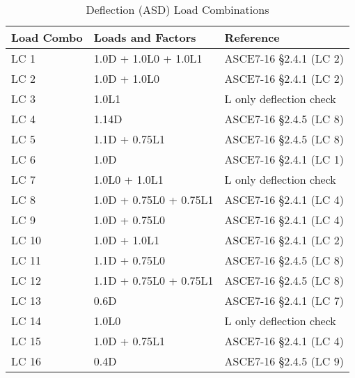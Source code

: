 \documentclass[12pt, fleqn]{article}
\begin{document}
\begin{table}[H]
\caption{Deflection (ASD) Load Combinations}
\centering
\begin{tabular}{l l l}
\hline
Load Combo & Loads and Factors & Reference\\
\hline
LC 1 & 1.0D + 1.0L0 + 1.0L1 & ASCE7-16 \S2.4.1 (LC 2)\\
LC 2 & 1.0D + 1.0L0 & ASCE7-16 \S2.4.1 (LC 2)\\
LC 3 & 1.0L1 & L only deflection check\\
LC 4 & 1.14D & ASCE7-16 \S2.4.5 (LC 8)\\
LC 5 & 1.1D + 0.75L1 & ASCE7-16 \S2.4.5 (LC 8)\\
LC 6 & 1.0D & ASCE7-16 \S2.4.1 (LC 1)\\
LC 7 & 1.0L0 + 1.0L1 & L only deflection check\\
LC 8 & 1.0D + 0.75L0 + 0.75L1 & ASCE7-16 \S2.4.1 (LC 4)\\
LC 9 & 1.0D + 0.75L0 & ASCE7-16 \S2.4.1 (LC 4)\\
LC 10 & 1.0D + 1.0L1 & ASCE7-16 \S2.4.1 (LC 2)\\
LC 11 & 1.1D + 0.75L0 & ASCE7-16 \S2.4.5 (LC 8)\\
LC 12 & 1.1D + 0.75L0 + 0.75L1 & ASCE7-16 \S2.4.5 (LC 8)\\
LC 13 & 0.6D & ASCE7-16 \S2.4.1 (LC 7)\\
LC 14 & 1.0L0 & L only deflection check\\
LC 15 & 1.0D + 0.75L1 & ASCE7-16 \S2.4.1 (LC 4)\\
LC 16 & 0.4D & ASCE7-16 \S2.4.5 (LC 9)\\
\hline
\end{tabular}
\end{table}
\end{document}
